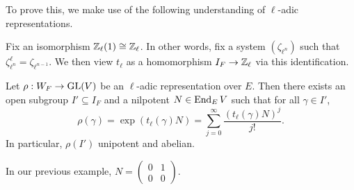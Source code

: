 \documentclass[a4paper]{article}
\begin{document}
To prove this, we make use of the following understanding of $\ell$-adic representations.
\begin{thm}
  Fix an isomorphism $\mathbb{Z}_{\ell}(1) \cong \mathbb{Z}_\ell$. In other words, fix a system $(\zeta_{\ell^n})$ such that $\zeta_{\ell^n}^\ell = \zeta_{\ell^{n - 1}}$. We then view $t_\ell$ as a homomorphism $I_F \to \mathbb{Z}_\ell$ via this identification.

  Let $\rho: W_F \to \mathrm{GL}(V)$ be an $\ell$-adic representation over $E$. Then there exists an open subgroup $I' \subseteq I_F$ and a nilpotent $N \in \operatorname{End}_E V$ such that for all $\gamma \in I'$,
  \[
    \rho(\gamma) = \exp (t_\ell(\gamma) N) = \sum_{j = 0}^\infty \frac{(t_\ell(\gamma) N)^j}{j!}.
  \]
  In particular, $\rho(I')$ unipotent and abelian.
\end{thm}
In our previous example, $N = \begin{pmatrix}0 & 1\\0 & 0\end{pmatrix}$.
\end{document}
